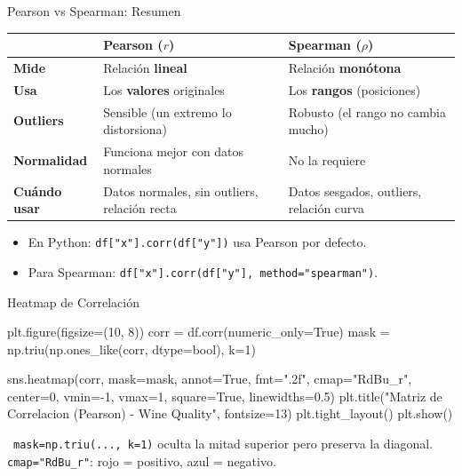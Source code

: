 \documentclass[aspectratio=169, 11pt]{beamer}
\begin{document}
\begin{frame}[shrink=5]{Pearson vs Spearman: Resumen}
  \vspace{-4pt}
  {\small
  \renewcommand{\arraystretch}{1.3}
  \begin{tabular}{@{}p{3cm}p{4.5cm}p{4.5cm}@{}}
    \toprule
    & \textbf{Pearson ($r$)} & \textbf{Spearman ($\rho$)} \\
    \midrule
    \textbf{Mide} &
      Relación \textbf{lineal} &
      Relación \textbf{monótona} \\
    \textbf{Usa} &
      Los \textbf{valores} originales &
      Los \textbf{rangos} (posiciones) \\
    \textbf{Outliers} &
      Sensible (un extremo lo distorsiona) &
      Robusto (el rango no cambia mucho) \\
    \textbf{Normalidad} &
      Funciona mejor con datos normales &
      No la requiere \\
    \textbf{Cuándo usar} &
      Datos normales, sin outliers, relación recta &
      Datos sesgados, outliers, relación curva \\
    \bottomrule
  \end{tabular}
  }

  \vspace{6pt}
  {\scriptsize\color{textMuted}
  \begin{itemize}\setlength{\itemsep}{3pt}
    \item[{\color{codeBlue}\scriptsize\faArrowRight}]
      En Python: \texttt{df["x"].corr(df["y"])} usa Pearson por defecto.
    \item[{\color{codePurple}\scriptsize\faArrowRight}]
      Para Spearman: \texttt{df["x"].corr(df["y"], method="spearman")}.
  \end{itemize}
  }
\end{frame}

\begin{frame}[fragile,shrink=28]{Heatmap de Correlación}
  \vspace{-6pt}
  \begin{pyblock}
plt.figure(figsize=(10, 8))
corr = df.corr(numeric_only=True)
mask = np.triu(np.ones_like(corr, dtype=bool), k=1)

sns.heatmap(corr, mask=mask, annot=True, fmt=".2f",
            cmap="RdBu_r", center=0, vmin=-1, vmax=1,
            square=True, linewidths=0.5)
plt.title("Matriz de Correlacion (Pearson) - Wine Quality",
          fontsize=13)
plt.tight_layout()
plt.show()
  \end{pyblock}

  \vspace{4pt}
  {\scriptsize\color{textMuted}
    \faLightbulb\ \texttt{mask=np.triu(..., k=1)} oculta la mitad superior pero preserva la diagonal.
    \texttt{cmap="RdBu\_r"}: rojo = positivo, azul = negativo.}
\end{frame}
\end{document}
